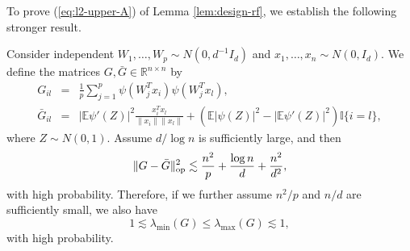 To prove (\ref{eq:l2-upper-A}) of Lemma \ref{lem:design-rf}, we establish the following stronger result.
\begin{lemma}\label{lem:lim-G}
Consider independent $W_1,\ldots,W_p\sim N(0,d^{-1}I_d)$ and $x_1,\ldots,x_n\sim N(0,I_d)$. We define the matrices $G,\bar{G}\in\mathbb{R}^{n\times n}$ by
\begin{eqnarray*}
G_{il} &=& \frac{1}{p}\sum_{j=1}^p\psi(W^T_jx_i)\psi(W_j^Tx_l), \\
\bar{G}_{il} &=& |\mathbb{E}\psi'(Z)|^2\frac{x_i^Tx_l}{\|x_i\|\|x_l\|} + \left(\mathbb{E}|\psi(Z)|^2-|\mathbb{E}\psi'(Z)|^2\right)\mathbb{I}\{i=l\},
\end{eqnarray*}
where $Z\sim N(0,1)$.
Assume $d/\log n$ is sufficiently large, and then
$$\|G-\bar{G}\|_{\rm op}^2\lesssim \frac{n^2}{p} + \frac{\log n}{d} + \frac{n^2}{d^2},$$
with high probability. Therefore, if we further assume $n^2/p$ and $n/d$ are sufficiently small, we also have
\begin{equation}
1\lesssim\lambda_{\min}(G)\leq \lambda_{\max}(G)\lesssim 1, \label{eq:spectrum-G-bound}
\end{equation}
with high probability.
\end{lemma}
